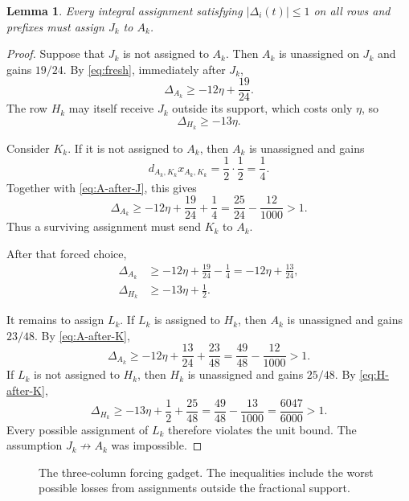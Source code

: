 \documentclass[11pt]{article}
\newtheorem{lemma}[theorem]{Lemma}
\theoremstyle{definition}
\newcommand{\disc}{\Delta}
\begin{document}
\begin{lemma}\label{lem:force}
Every integral assignment satisfying $|\disc_i(t)|\le1$ on all rows and
prefixes must assign $J_k$ to $A_k$.
\end{lemma}

\begin{proof}
Suppose that $J_k$ is not assigned to $A_k$.  Then $A_k$ is unassigned on
$J_k$ and gains $19/24$.  By \eqref{eq:fresh}, immediately after $J_k$,
\begin{equation}\label{eq:A-after-J}
 \disc_{A_k}\ge-12\eta+\frac{19}{24}.
\end{equation}
The row $H_k$ may itself receive $J_k$ outside its support, which costs only
$\eta$, so
\begin{equation}\label{eq:H-after-J}
 \disc_{H_k}\ge-13\eta.
\end{equation}

Consider $K_k$.  If it is not assigned to $A_k$, then $A_k$ is unassigned
and gains
\[
 d_{A_k,K_k}x_{A_k,K_k}=\frac12\cdot\frac12=\frac14.
\]
Together with \eqref{eq:A-after-J}, this gives
\[
 \disc_{A_k}\ge-12\eta+\frac{19}{24}+\frac14
 =\frac{25}{24}-\frac{12}{1000}>1.
\]
Thus a surviving assignment must send $K_k$ to $A_k$.

After that forced choice,
\begin{align}
 \disc_{A_k}&\ge-12\eta+\frac{19}{24}-\frac14
             =-12\eta+\frac{13}{24},\label{eq:A-after-K}\\
 \disc_{H_k}&\ge-13\eta+\frac12.\label{eq:H-after-K}
\end{align}

It remains to assign $L_k$.  If $L_k$ is assigned to $H_k$, then $A_k$ is
unassigned and gains $23/48$.  By \eqref{eq:A-after-K},
\[
 \disc_{A_k}\ge-12\eta+\frac{13}{24}+\frac{23}{48}
 =\frac{49}{48}-\frac{12}{1000}>1.
\]
If $L_k$ is not assigned to $H_k$, then $H_k$ is unassigned and gains
$25/48$.  By \eqref{eq:H-after-K},
\[
 \disc_{H_k}\ge-13\eta+\frac12+\frac{25}{48}
 =\frac{49}{48}-\frac{13}{1000}
 =\frac{6047}{6000}>1.
\]
Every possible assignment of $L_k$ therefore violates the unit bound.  The
assumption $J_k\not\to A_k$ was impossible.
\end{proof}

\begin{figure}[ht]
\centering
\resizebox{\textwidth}{!}{}
\caption{The three-column forcing gadget.  The inequalities include the
worst possible losses from assignments outside the fractional support.}
\label{fig:gadget}
\end{figure}
\end{document}

